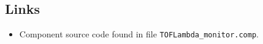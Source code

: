 \subsection*{Links}
\begin{itemize}
  \item Component source code found in file \texttt{TOFLambda\_monitor.comp}.
\end{itemize}
